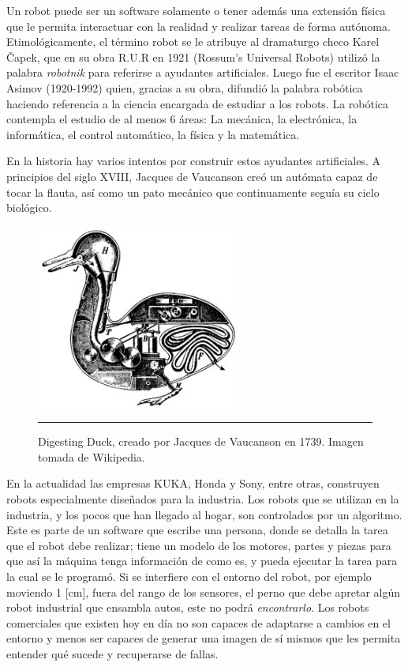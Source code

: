 Un robot puede ser un software solamente o tener además una extensión física que le permita interactuar con la realidad y realizar tareas de forma autónoma. Etimológicamente, el término robot se le atribuye al dramaturgo checo Karel Čapek, que en su obra R.U.R en 1921 (Rossum’s Universal Robots) utilizó la palabra \textit{robotnik} para referirse a ayudantes artificiales. Luego fue el escritor Isaac Asimov (1920-1992) quien,  gracias a su obra, difundió la palabra robótica haciendo referencia a la ciencia encargada de estudiar a los robots. La robótica contempla el estudio de al menos 6 áreas: La mecánica, la electrónica, la informática, el control automático, la física y la matemática.

En la historia hay varios intentos por construir estos ayudantes artificiales. A principios del siglo XVIII, Jacques de Vaucanson creó un autómata capaz de tocar la flauta, así como un pato mecánico que continuamente seguía su ciclo biológico.

\begin{figure}[htbp]
	\centering
		\includegraphics[width=0.6\textwidth]{./Figures/Duck_of_Vaucanson.jpg}
		\rule{35em}{0.5pt}
	\caption[Robot Digesting Duck]{Digesting Duck, creado por Jacques de Vaucanson en 1739. Imagen tomada de Wikipedia.}
	\label{fig:Duck}
\end{figure}

En la actualidad las empresas KUKA, Honda y Sony, entre otras, construyen robots especialmente diseñados para la industria. Los robots que se utilizan en la industria, y los pocos que han llegado al hogar, son controlados por un algoritmo. Este es parte de un software que escribe una persona, donde se detalla la tarea que el robot debe realizar; tiene un modelo de los motores, partes y piezas para que así la máquina tenga información de como es, y pueda ejecutar la tarea para la cual se le programó. Si se interfiere con el entorno del robot, por ejemplo moviendo 1 [cm], fuera del rango de los sensores, el perno que debe apretar algún robot industrial que ensambla autos, este no podrá \textit{encontrarlo}. Los robots comerciales que existen hoy en día no son capaces de adaptarse a cambios en el entorno y menos ser capaces de generar una imagen de sí mismos que les permita entender qué sucede y recuperarse de fallas.

